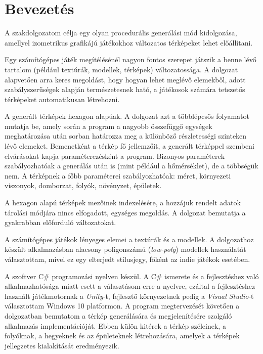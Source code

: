 \chapter*{Bevezetés}

A szakdolgozatom célja egy olyan procedurális generálási mód kidolgozása, amellyel izometrikus grafikájú játékokhoz változatos térképeket lehet előállítani.

Egy számítógépes játék megítélésénél nagyon fontos szerepet játszik a benne lévő tartalom (például textúrák, modellek, térképek) változatossága. A dolgozat alapvetően arra keres megoldást, hogy hogyan lehet meglévő elemekből, adott szabályszerűségek alapján természetesnek ható, a játékosok számára tetszetős térképeket automatikusan létrehozni.

A generált térképek hexagon alapúak. A dolgozat azt a többlépcsős folyamatot mutatja be, amely során a program a nagyobb összefüggő egységek meghatározása után sorban határozza meg a különböző részletességi szinteken lévő elemeket. Bemenetként a térkép fő jellemzőit, a generált térképpel szembeni elvárásokat kapja paraméterezésként a program. Bizonyos paraméterek szabályozhatóak a generálás után is (mint például a hőmérséklet), de a többségük nem. A térképnek a főbb paraméterei szabályozhatóak: méret, környezeti viszonyok, domborzat, folyók, növényzet, épületek. 

A hexagon alapú térképek mezőinek indexelésére, a hozzájuk rendelt adatok tárolási módjára nincs elfogadott, egységes megoldás. A dolgozat bemutatja a gyakrabban előforduló változatokat.

A számítógépes játékok lényeges elemei a textúrák és a modellek. A dolgozathoz készült alkalmazásban alacsony poligonszámú (\textit{low-poly}) modellek használatát választottam, mivel ez egy elterjedt stílusjegy, főként az indie játékok esetében.

A szoftver C\# programozási nyelven készül. A C\# ismerete és a fejlesztéshez való alkalmazhatósága miatt esett a választásom erre a nyelvre, ezáltal a fejlesztéshez használt játékmotornak a \textit{Unity}-t, fejlesztő környezetnek pedig a \textit{Visual Studio}-t választottam Windows 10 platformon. A program megtervezését követően a dolgozatban bemutatom a térkép generálására és megjelenítésére szolgáló alkalmazás implementációját. Ebben külön kitérek a térkép széleinek, a folyóknak, a hegyeknek és az épületeknek létrehozására, amelyek a térképek jellegzetes kialakítását eredményezik.
